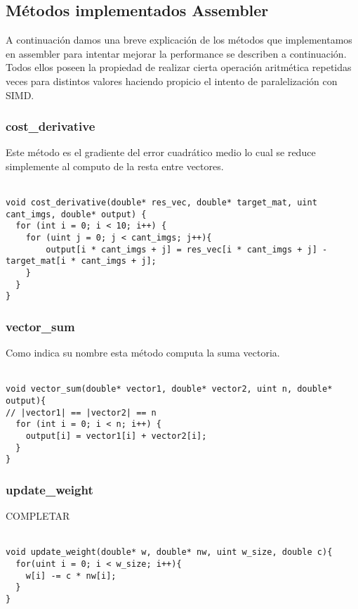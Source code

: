 \subsection{Métodos implementados Assembler}

A continuación damos una breve explicación de los métodos que implementamos en assembler para intentar mejorar la performance se describen a continuación. Todos ellos poseen la propiedad de realizar cierta operación aritmética repetidas veces para distintos valores haciendo propicio el intento de paralelización con SIMD.

\subsubsection{cost\_derivative}

Este método es el gradiente del error cuadrático medio lo cual se reduce simplemente al computo de la resta entre vectores.
\\
\\
\begin{lstlisting}
void cost_derivative(double* res_vec, double* target_mat, uint cant_imgs, double* output) {
  for (int i = 0; i < 10; i++) {
    for (uint j = 0; j < cant_imgs; j++){
        output[i * cant_imgs + j] = res_vec[i * cant_imgs + j] - target_mat[i * cant_imgs + j];
    }
  }
}
\end{lstlisting}

\subsubsection{vector\_sum}

Como indica su nombre esta método computa la suma vectoria.
\\
\\
\begin{lstlisting}[frame=single]
void vector_sum(double* vector1, double* vector2, uint n, double* output){
// |vector1| == |vector2| == n
  for (int i = 0; i < n; i++) {
    output[i] = vector1[i] + vector2[i];
  }
}
\end{lstlisting}


\subsubsection{update\_weight}

COMPLETAR
\\
\\
\begin{lstlisting}[frame=single]
void update_weight(double* w, double* nw, uint w_size, double c){
  for(uint i = 0; i < w_size; i++){
    w[i] -= c * nw[i];
  }
}
\end{lstlisting}

